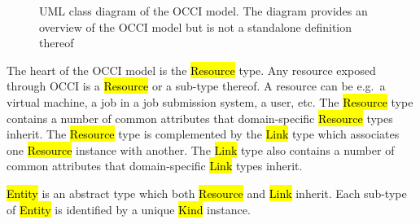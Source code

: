 \documentclass[10pt,a4paper]{article}
\begin{document}
\begin{figure}[!h]
{\centering {} \par}
\caption{UML class diagram of the OCCI model. The diagram provides an
overview of the OCCI model but is not a standalone definition thereof}
\label{fig:occi_model}
\end{figure}

The heart of the OCCI model is the \hl{Resource} type. Any resource exposed
through OCCI is a \hl{Resource} or a sub-type thereof.
A resource can be e.g.~a virtual machine, a job in a job submission system, a
user, etc.
%
The \hl{Resource} type contains a number of common attributes that
domain-specific \hl{Resource} types inherit. The \hl{Resource} type is
complemented by the \hl{Link} type which associates one \hl{Resource} instance
with another.
%
The \hl{Link} type also contains a number of common attributes that
domain-specific \hl{Link} types inherit.

\hl{Entity} is an abstract type which both \hl{Resource} and \hl{Link} inherit.
Each sub-type of \hl{Entity} is identified by a unique \hl{Kind} instance.
%
\end{document}
